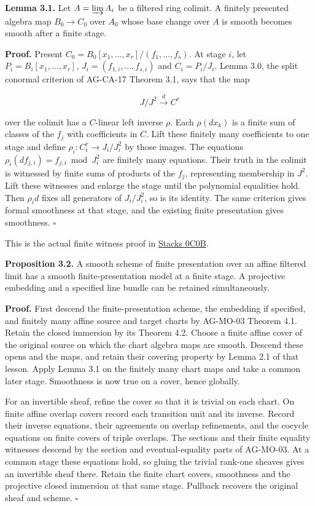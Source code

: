 \documentclass[11pt,a4paper,openany]{report}
\begin{document}
\textbf{Lemma 3.1.} Let \(A=\varinjlim A_i\) be a filtered ring colimit. A finitely presented algebra map \(B_0\to C_0\) over \(A_0\) whose base change over \(A\) is smooth becomes smooth after a finite stage.

\textbf{Proof.} Present \(C_0=B_0[x_1,\ldots,x_r]/(f_1,\ldots,f_s)\). At stage \(i\), let \(P_i=B_i[x_1,\ldots,x_r]\), \(J_i=(f_{1,i},\ldots,f_{s,i})\) and \(C_i=P_i/J_i\). Lemma 3.0, the split conormal criterion of AG-CA-17 Theorem 3.1, says that the map

\[
J/J^2\xrightarrow{d}C^r
\]

over the colimit has a \(C\)-linear left inverse \(\rho\). Each \(\rho(dx_k)\) is a finite sum of classes of the \(f_j\) with coefficients in \(C\). Lift these finitely many coefficients to one stage and define \(\rho_i:C_i^r\to J_i/J_i^2\) by those images. The equations \(\rho_i(df_{j,i})=f_{j,i}\bmod J_i^2\) are finitely many equations. Their truth in the colimit is witnessed by finite sums of products of the \(f_j\), representing membership in \(J^2\). Lift these witnesses and enlarge the stage until the polynomial equalities hold. Then \(\rho_id\) fixes all generators of \(J_i/J_i^2\), so is its identity. The same criterion gives formal smoothness at that stage, and the existing finite presentation gives smoothness. \(\square\)

This is the actual finite witness proof in \href{https://stacks.math.columbia.edu/tag/0C0B}{Stacks 0C0B}.

\textbf{Proposition 3.2.} A smooth scheme of finite presentation over an affine filtered limit has a smooth finite-presentation model at a finite stage. A projective embedding and a specified line bundle can be retained simultaneously.

\textbf{Proof.} First descend the finite-presentation scheme, the embedding if specified, and finitely many affine source and target charts by AG-MO-03 Theorem 4.1. Retain the closed immersion by its Theorem 4.2. Choose a finite affine cover of the original source on which the chart algebra maps are smooth. Descend these opens and the maps, and retain their covering property by Lemma 2.1 of that lesson. Apply Lemma 3.1 on the finitely many chart maps and take a common later stage. Smoothness is now true on a cover, hence globally.

For an invertible sheaf, refine the cover so that it is trivial on each chart. On finite affine overlap covers record each transition unit and its inverse. Record their inverse equations, their agreements on overlap refinements, and the cocycle equations on finite covers of triple overlaps. The sections and their finite equality witnesses descend by the section and eventual-equality parts of AG-MO-03. At a common stage these equations hold, so gluing the trivial rank-one sheaves gives an invertible sheaf there. Retain the finite chart covers, smoothness and the projective closed immersion at that same stage. Pullback recovers the original sheaf and scheme. \(\square\)
\end{document}
